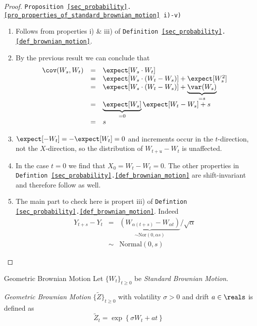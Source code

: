 \documentclass[11pt,a4paper]{article}
\begin{document}
  \begin{proof}{\texttt{Proposition \ref{sec_probability}.\ref{pro_properties_of_standard_brownian_motion} i)-v)}}
    \begin{enumerate}
      \item Follows from properties i) \& iii) of \texttt{Definition \ref{sec_probability}.\ref{def_brownian_motion}}.
      \item By the previous result we can conclude that
      \[\begin{array}{rcl}
        \cov(W_s,W_t)&=&\expect[W_s\cdot W_t]\\
        &=&\expect[W_s\cdot(W_t-W_s)]+\expect[W_s^2]\\
        &=&\expect[W_s\cdot(W_t-W_s)]+\underbrace{\var(W_s)}_{=s}\\
        &=&\underbrace{\expect[W_s]}_{=0}\expect[W_t-W_s]+s\\
        &=&s
      \end{array}\]
      \item $\expect[-W_t]=-\expect[W_t]=0$ and increments occur in the $t$-direction, not the $X$-direction, so the distribution of $W_{t+u}-W_t$ is unaffected.
      \item In the case $t=0$ we find that $X_0=W_t-W_t=0$. The other properties in \texttt{Defintion \ref{sec_probability}.\ref{def_brownian_motion}} are shift-invariant and therefore follow as well.
      \item The main part to check here is propert iii) of \texttt{Defintion \ref{sec_probability}.\ref{def_brownian_motion}}. Indeed
      \[\begin{array}{rcl}
        Y_{t+s}-Y_t&=&\underbrace{(W_{\alpha(t+s)}-W_{\alpha t})}_{\sim\text{Nor}(0,\alpha s)}/\sqrt{\alpha}\\
        &\sim&\text{Normal}(0,s)
      \end{array}\]
    \end{enumerate}
    \proved
  \end{proof}

  \begin{definition}{Geometric Brownian Motion}
    Let $\{W_t\}_{t\geq0}$ be \textit{Standard Brownian Motion}.
    \par \textit{Geometric Brownian Motion} $\{\tilde{Z}\}_{t\geq0}$ with volatility $\sigma>0$ and drift $a\in\reals$ is defined as
    \[ \tilde{Z}_t=\exp\left\{\sigma W_t+at\right\} \]
  \end{definition}
\end{document}

